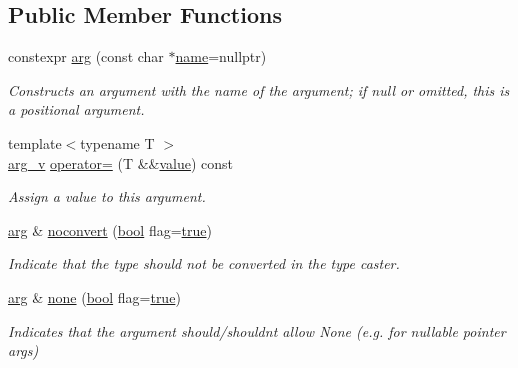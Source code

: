 \subsection*{Public Member Functions}
\begin{DoxyCompactItemize}
\item 
constexpr \mbox{\hyperlink{structarg_ae6211325dd7551f254b0428f9e1e4e4c}{arg}} (const char $\ast$\mbox{\hyperlink{structname}{name}}=nullptr)
\begin{DoxyCompactList}\small\item\em Constructs an argument with the name of the argument; if null or omitted, this is a positional argument. \end{DoxyCompactList}\item 
{\footnotesize template$<$typename T $>$ }\\\mbox{\hyperlink{structarg__v}{arg\+\_\+v}} \mbox{\hyperlink{structarg_af21c066dfb7fe62ff952a8ea4713b7ed}{operator=}} (T \&\&\mbox{\hyperlink{_s_d_l__opengl__glext_8h_a8ad81492d410ff2ac11f754f4042150f}{value}}) const
\begin{DoxyCompactList}\small\item\em Assign a value to this argument. \end{DoxyCompactList}\item 
\mbox{\hyperlink{structarg}{arg}} \& \mbox{\hyperlink{structarg_affdcf2c99a2f27cb539efd6853335d4b}{noconvert}} (\mbox{\hyperlink{asdl_8h_af6a258d8f3ee5206d682d799316314b1}{bool}} flag=\mbox{\hyperlink{asdl_8h_af6a258d8f3ee5206d682d799316314b1a08f175a5505a10b9ed657defeb050e4b}{true}})
\begin{DoxyCompactList}\small\item\em Indicate that the type should not be converted in the type caster. \end{DoxyCompactList}\item 
\mbox{\hyperlink{structarg}{arg}} \& \mbox{\hyperlink{structarg_a99082d77a1a365593a16939f03194e5e}{none}} (\mbox{\hyperlink{asdl_8h_af6a258d8f3ee5206d682d799316314b1}{bool}} flag=\mbox{\hyperlink{asdl_8h_af6a258d8f3ee5206d682d799316314b1a08f175a5505a10b9ed657defeb050e4b}{true}})
\begin{DoxyCompactList}\small\item\em Indicates that the argument should/shouldn\textquotesingle{}t allow None (e.\+g. for nullable pointer args) \end{DoxyCompactList}\end{DoxyCompactItemize}
